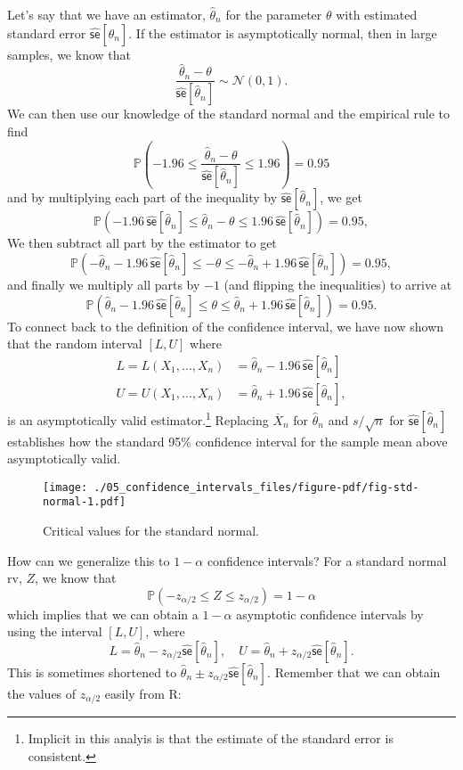 \documentclass[
  letterpaper,
  DIV=11,
  numbers=noendperiod]{scrreprt}
\newcommand{\N}{\mathcal{N}}
\newcommand{\se}{\textsf{se}}
\renewcommand{\P}{\mathbb{P}}
\newcommand{\Xbar}{\overline{X}}
\theoremstyle{definition}
\theoremstyle{plain}
\theoremstyle{definition}
\theoremstyle{remark}
\begin{document}
Let's say that we have an estimator, \(\widehat{\theta}_n\) for the
parameter \(\theta\) with estimated standard error
\(\widehat{\se}[\widehat{\theta}_n]\). If the estimator is
asymptotically normal, then in large samples, we know that \[ 
\frac{\widehat{\theta}_n - \theta}{\widehat{\se}[\widehat{\theta}_n]} \sim \N(0, 1).
\] We can then use our knowledge of the standard normal and the
empirical rule to find \[ 
\P\left( -1.96 \leq \frac{\widehat{\theta}_n - \theta}{\widehat{\se}[\widehat{\theta}_n]} \leq 1.96\right) = 0.95
\] and by multiplying each part of the inequality by
\(\widehat{\se}[\widehat{\theta}_n]\), we get \[ 
\P\left( -1.96\,\widehat{\se}[\widehat{\theta}_n] \leq \widehat{\theta}_n - \theta \leq 1.96\,\widehat{\se}[\widehat{\theta}_n]\right) = 0.95,
\] We then subtract all part by the estimator to get \[ 
\P\left(-\widehat{\theta}_n - 1.96\,\widehat{\se}[\widehat{\theta}_n] \leq  - \theta \leq -\widehat{\theta}_n + 1.96\,\widehat{\se}[\widehat{\theta}_n]\right) = 0.95,
\] and finally we multiply all parts by \(-1\) (and flipping the
inequalities) to arrive at \[ 
\P\left(\widehat{\theta}_n - 1.96\,\widehat{\se}[\widehat{\theta}_n] \leq  \theta \leq \widehat{\theta}_n + 1.96\,\widehat{\se}[\widehat{\theta}_n]\right) = 0.95.
\] To connect back to the definition of the confidence interval, we have
now shown that the random interval \([L, U]\) where \[ 
\begin{aligned}
  L = L(X_1, \ldots, X_n) &= \widehat{\theta}_n - 1.96\,\widehat{\se}[\widehat{\theta}_n] \\
  U = U(X_1, \ldots, X_n) &= \widehat{\theta}_n + 1.96\,\widehat{\se}[\widehat{\theta}_n],
\end{aligned}
\] is an asymptotically valid estimator.\footnote{Implicit in this
  analyis is that the estimate of the standard error is consistent.}
Replacing \(\Xbar_n\) for \(\widehat{\theta}_n\) and \(s/\sqrt{n}\) for
\(\widehat{\se}[\widehat{\theta}_n]\) establishes how the standard 95\%
confidence interval for the sample mean above asymptotically valid.

\begin{figure}

{\centering \texttt{[image: ./05\_confidence\_intervals\_files/figure-pdf/fig-std-normal-1.pdf]}

}

\caption{\label{fig-std-normal}Critical values for the standard normal.}

\end{figure}

How can we generalize this to \(1-\alpha\) confidence intervals? For a
standard normal rv, \(Z\), we know that \[ 
\P(-z_{\alpha/2} \leq Z \leq z_{\alpha/2}) = 1-\alpha
\] which implies that we can obtain a \(1-\alpha\) asymptotic confidence
intervals by using the interval \([L, U]\), where \[ 
L = \widehat{\theta}_{n} - z_{\alpha/2} \widehat{\se}[\widehat{\theta}_{n}], \quad U = \widehat{\theta}_{n} + z_{\alpha/2} \widehat{\se}[\widehat{\theta}_{n}]. 
\] This is sometimes shortened to
\(\widehat{\theta}_n \pm z_{\alpha/2} \widehat{\se}[\widehat{\theta}_{n}]\).
Remember that we can obtain the values of \(z_{\alpha/2}\) easily from
R:
\end{document}

